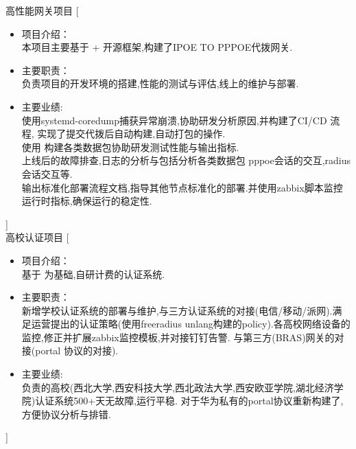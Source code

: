 \documentclass[zh]{resume}
\begin{document}
\begin{experiences}
  
  {高性能网关项目}%
  [\begin{itemize}
    \item 项目介绍：\\
    本项目主要基于 +  开源框架,构建了IPOE TO PPPOE代拨网关.
    \item 主要职责：\\
    负责项目的开发环境的搭建,性能的测试与评估,线上的维护与部署. 
    \item 主要业绩: \\
    使用systemd-coredump捕获异常崩溃,协助研发分析原因,并构建了CI/CD 流程, 实现了提交代拨后自动构建,自动打包的操作. \\
    使用  构建各类数据包协助研发测试性能与输出指标. \\
    上线后的故障排查,日志的分析与包括分析各类数据包 pppoe会话的交互,radius 会话交互等.\\
    输出标准化部署流程文档,指导其他节点标准化的部署.并使用zabbix脚本监控运行时指标,确保运行的稳定性. 
  \end{itemize}]
  \\
  {高校认证项目}%
  [\begin{itemize}
    \item 项目介绍：\\
    基于 为基础,自研计费的认证系统.
    \item 主要职责：\\
    新增学校认证系统的部署与维护,与三方认证系统的对接(电信/移动/派网).满足运营提出的认证策略(使用freeradius unlang构建的policy).各高校网络设备的监控,修正并扩展zabbix监控模板,并对接钉钉告警.
    与第三方(BRAS)网关的对接(portal 协议的对接).
    \item 主要业绩: \\
    负责的高校(西北大学,西安科技大学,西北政法大学,西安欧亚学院,湖北经济学院)认证系统500+天无故障,运行平稳.
    对于华为私有的portal协议重新构建了,方便协议分析与排错.
  \end{itemize}]

\end{experiences}
\end{document}
